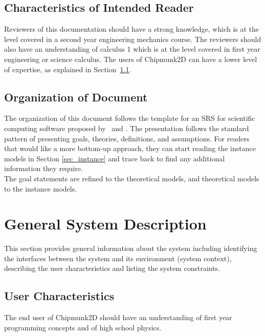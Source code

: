 \documentclass[12pt]{article}
\begin{document}
\subsection{Characteristics of Intended Reader}
\label{Sec_CharofInteRead}
Reviewers of this documentation should have a strong knowledge, which is at the level covered in a second year engineering mechanics course. The reviewers should also have an understanding of calculus 1 which is at the level covered in first year engineering or science calculus. The users of Chipmunk2D can have a lower level of expertise, as explained in Section~\ref{Sec_UserChar}.

\subsection{Organization of Document}
The organization of this document follows the template for an SRS for scientific
computing software proposed by~\cite{Koothoor2013} and \cite{SmithAndLai2005}.
The presentation follows the standard pattern of presenting goals, theories,
definitions, and assumptions.  For readers that would like a more bottom-up
approach, they can start reading the instance models in Section
\ref{sec_instance} and trace back to find any additional information they
require. \\
\newline
The goal statements are refined to the theoretical models, and theoretical
models to the instance models.  


%
%

\section{General System Description}

This section provides general information about the system including identifying
the interfaces between the system and its environment (system context), describing
the user characteristics and listing the system constraints.

\subsection{User Characteristics}
\label{Sec_UserChar}

The end user of Chipmunk2D should have an understanding 
of first year programming concepts and of high school
physics.
\end{document}
